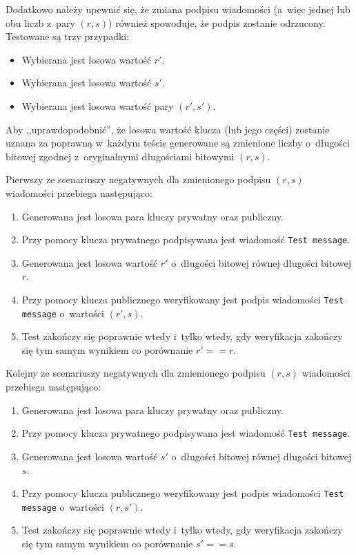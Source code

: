 \documentclass{article}
\begin{document}
        Dodatkowo należy upewnić się, że zmiana podpisu wiadomości (a~więc jednej lub obu liczb z~pary $(r, s)$) również spowoduje, że podpis zostanie odrzucony. Testowane są trzy przypadki:
        
        \begin{itemize}
            \item Wybierana jest losowa wartość $r'$.
            \item Wybierana jest losowa wartość $s'$.
            \item Wybierana jest losowa wartość pary $(r', s')$.
        \end{itemize}

        \noindent Aby ,,uprawdopodobnić'', że losowa wartość klucza (lub jego części) zostanie uznana za poprawną w~każdym teście generowane są zmienione liczby o~długości bitowej zgodnej z~oryginalnymi długościami bitowymi $(r, s)$.

        Pierwszy ze scenariuszy negatywnych dla zmienionego podpisu $(r, s)$ wiadomości przebiega następująco:
        
        \begin{enumerate}
            \item Generowana jest losowa para kluczy prywatny oraz publiczny.
            \item Przy pomocy klucza prywatnego podpisywana jest wiadomość \verb+Test message+.
            \item Generowana jest losowa wartość $r'$ o~długości bitowej równej długości bitowej $r$.
            \item Przy pomocy klucza publicznego weryfikowany jest podpis wiadomości \verb+Test message+ o~wartości $(r', s)$.
            \item Test zakończy się poprawnie wtedy i~tylko wtedy, gdy weryfikacja zakończy się tym samym wynikiem co porównanie $r' == r$.
        \end{enumerate}
        
        Kolejny ze scenariuszy negatywnych dla zmienionego podpisu $(r, s)$ wiadomości przebiega następująco:
        
        \begin{enumerate}
            \item Generowana jest losowa para kluczy prywatny oraz publiczny.
            \item Przy pomocy klucza prywatnego podpisywana jest wiadomość \verb+Test message+.
            \item Generowana jest losowa wartość $s'$ o~długości bitowej równej długości bitowej $s$.
            \item Przy pomocy klucza publicznego weryfikowany jest podpis wiadomości \verb+Test message+ o~wartości $(r, s')$.
            \item Test zakończy się poprawnie wtedy i~tylko wtedy, gdy weryfikacja zakończy się tym samym wynikiem co porównanie $s' == s$.
        \end{enumerate}
        
\end{document}
